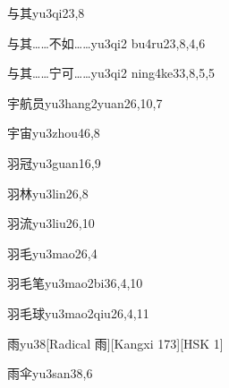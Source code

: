 \begin{entry}{与其}{yu3qi2}{3,8}
\end{entry}

\begin{entry}{与其……不如……}{yu3qi2 bu4ru2}{3,8,4,6}
\end{entry}

\begin{entry}{与其……宁可……}{yu3qi2 ning4ke3}{3,8,5,5}
\end{entry}

\begin{entry}{宇航员}{yu3hang2yuan2}{6,10,7}
\end{entry}

\begin{entry}{宇宙}{yu3zhou4}{6,8}
\end{entry}

\begin{entry}{羽冠}{yu3guan1}{6,9}
\end{entry}

\begin{entry}{羽林}{yu3lin2}{6,8}
\end{entry}

\begin{entry}{羽流}{yu3liu2}{6,10}
\end{entry}

\begin{entry}{羽毛}{yu3mao2}{6,4}
\end{entry}

\begin{entry}{羽毛笔}{yu3mao2bi3}{6,4,10}
\end{entry}

\begin{entry}{羽毛球}{yu3mao2qiu2}{6,4,11}
\end{entry}

\begin{entry}{雨}{yu3}{8}[Radical 雨][Kangxi 173][HSK 1]
\end{entry}

\begin{entry}{雨伞}{yu3san3}{8,6}
\end{entry}

